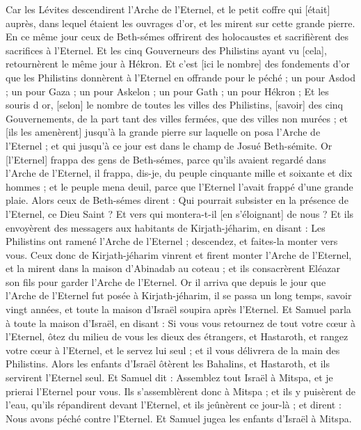 \begin{multicols}{2}
Car les Lévites descendirent l'Arche de l'Eternel, et le petit coffre qui [était] auprès, dans lequel étaient les ouvrages d'or, et les mirent sur cette grande pierre. En ce même jour ceux de Beth-sémes offrirent des holocaustes et sacrifièrent des sacrifices à l'Eternel.
Et les cinq Gouverneurs des Philistins ayant vu [cela], retournèrent le même jour à Hékron.
Et c'est [ici le nombre] des fondements d'or que les Philistins donnèrent à l'Eternel en offrande pour le péché ; un pour Asdod ; un pour Gaza ; un pour Askelon ; un pour Gath ; un pour Hékron ;
Et les souris d or, [selon] le nombre de toutes les villes des Philistins, [savoir] des cinq Gouvernements, de la part tant des villes fermées, que des villes non murées ; et [ils les amenèrent] jusqu'à la grande pierre sur laquelle on posa l'Arche de l'Eternel ; et qui jusqu'à ce jour est dans le champ de Josué Beth-sémite.
Or [l'Eternel] frappa des gens de Beth-sémes, parce qu'ils avaient regardé dans l'Arche de l'Eternel, il frappa, dis-je, du peuple cinquante mille et soixante et dix hommes ; et le peuple mena deuil, parce que l'Eternel l'avait frappé d'une grande plaie.
Alors ceux de Beth-sémes dirent : Qui pourrait subsister en la présence de l'Eternel, ce Dieu Saint ? Et vers qui montera-t-il [en s'éloignant] de nous ?
Et ils envoyèrent des messagers aux habitants de Kirjath-jéharim, en disant : Les Philistins ont ramené l'Arche de l'Eternel ; descendez, et faites-la monter vers vous.
\VerseOne{}Ceux donc de Kirjath-jéharim vinrent et firent monter l'Arche de l'Eternel, et la mirent dans la maison d'Abinadab au coteau ; et ils consacrèrent Eléazar son fils pour garder l'Arche de l'Eternel.
Or il arriva que depuis le jour que l'Arche de l'Eternel fut posée à Kirjath-jéharim, il se passa un long temps, savoir vingt années, et toute la maison d'Israël soupira après l'Eternel.
Et Samuel parla à toute la maison d'Israël, en disant : Si vous vous retournez de tout votre cœur à l'Eternel, ôtez du milieu de vous les dieux des étrangers, et Hastaroth, et rangez votre cœur à l'Eternel, et le servez lui seul ; et il vous délivrera de la main des Philistins.
Alors les enfants d'Israël ôtèrent les Bahalins, et Hastaroth, et ils servirent l'Eternel seul.
Et Samuel dit : Assemblez tout Israël à Mitspa, et je prierai l'Eternel pour vous.
Ils s'assemblèrent donc à Mitspa ; et ils y puisèrent de l'eau, qu'ils répandirent devant l'Eternel, et ils jeûnèrent ce jour-là ; et dirent : Nous avons péché contre l'Eternel. Et Samuel jugea les enfants d'Israël à Mitspa.

\end{multicols}
